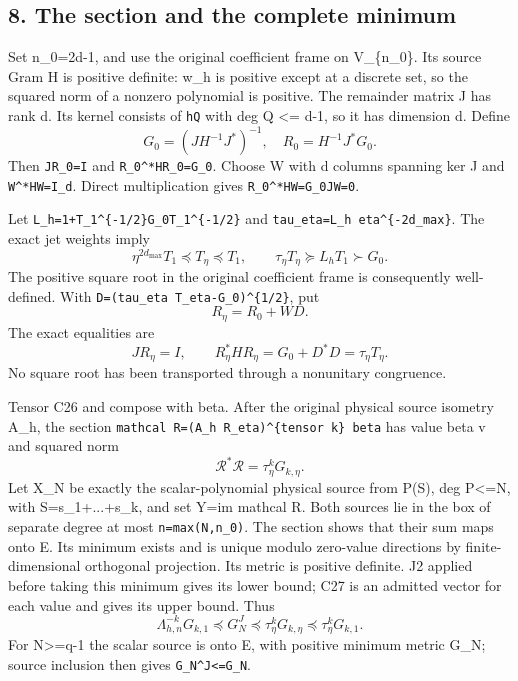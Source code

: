 \documentclass[11pt]{article}
\begin{document}
\subsection{8. The section and the complete minimum}\label{the-section-and-the-complete-minimum}

Set n\_0=2d-1, and use the original coefficient frame on V\_\{n\_0\}. Its source Gram H is positive definite: w\_h is positive except at a discrete set, so the squared norm of a nonzero polynomial is positive. The remainder matrix J has rank d. Its kernel consists of \texttt{hQ} with deg Q \textless= d-1, so it has dimension d. Define \[
G_0=(JH^{-1}J^*)^{-1},\quad R_0=H^{-1}J^*G_0.
\] Then \texttt{JR\_0=I} and \texttt{R\_0\^{}*HR\_0=G\_0}. Choose W with d columns spanning ker J and \texttt{W\^{}*HW=I\_d}. Direct multiplication gives \texttt{R\_0\^{}*HW=G\_0JW=0}.

Let \texttt{L\_h=1+\textbar{}\textbar{}T\_1\^{}\{-1/2\}G\_0T\_1\^{}\{-1/2\}\textbar{}\textbar{}} and \texttt{tau\_eta=L\_h\ eta\^{}\{-2d\_max\}}. The exact jet weights imply \[
\eta^{2d_{\max}}T_1\preceq T_\eta\preceq T_1,
\qquad \tau_\eta T_\eta\succeq L_hT_1\succ G_0.
\] The positive square root in the original coefficient frame is consequently well-defined. With \texttt{D=(tau\_eta\ T\_eta-G\_0)\^{}\{1/2\}}, put \[
R_\eta=R_0+WD.
\] The exact equalities are \[
JR_\eta=I,\qquad R_\eta^*HR_\eta
=G_0+D^*D=\tau_\eta T_\eta.
\tag{C26}
\] No square root has been transported through a nonunitary congruence.

Tensor C26 and compose with beta. After the original physical source isometry A\_h, the section \texttt{mathcal\ R=(A\_h\ R\_eta)\^{}\{tensor\ k\}\ beta} has value beta v and squared norm \[
\mathcal R^*\mathcal R=\tau_\eta^kG_{k,\eta}.
\tag{C27}
\] Let X\_N be exactly the scalar-polynomial physical source from P(S), deg P\textless=N, with S=s\_1+...+s\_k, and set Y=im mathcal R. Both sources lie in the box of separate degree at most \texttt{n=max(N,n\_0)}. The section shows that their sum maps onto E. Its minimum exists and is unique modulo zero-value directions by finite-dimensional orthogonal projection. Its metric is positive definite. J2 applied before taking this minimum gives its lower bound; C27 is an admitted vector for each value and gives its upper bound. Thus \[
\Lambda_{h,n}^{-k}G_{k,1}\preceq G_N^J
\preceq\tau_\eta^kG_{k,\eta}\preceq\tau_\eta^kG_{k,1}.
\tag{C28}
\] For N\textgreater=q-1 the scalar source is onto E, with positive minimum metric G\_N; source inclusion then gives \texttt{G\_N\^{}J\textless{}=G\_N}.
\end{document}
